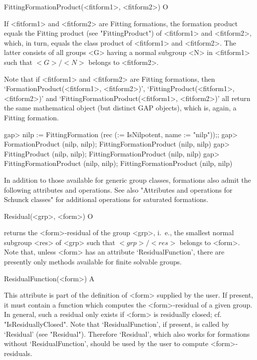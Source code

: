 \>FittingFormationProduct(<fitform1>, <fitform2>) O

If <fitform1> and <fitform2>  are Fitting formations, the formation product
equals the Fitting product (see "FittingProduct") of <fitform1> and
<fitform2>, which, in turn, equals the class product of <fitform1> and
<fitform2>. The latter consists of all groups <G> having a  normal subgroup
<N> in <fitform1> such that $<G>/<N>$ belongs to <fitform2>.

Note that if <fitform1> and <fitform2> are Fitting formations, then 
`FormationProduct(<fitform1>, <fitform2>)', `FittingProduct(<fitform1>,
<fitform2>)' and `FittingFormationProduct(<fitform1>, <fitform2>)' all
return the same mathematical object (but distinct GAP objects), which is,
again, a Fitting formation.


\beginexample
gap> nilp := FittingFormation (rec (\in := IsNilpotent, name := "nilp"));;
gap> FormationProduct (nilp, nilp);
FittingFormationProduct (nilp, nilp)
gap> FittingProduct (nilp, nilp);
FittingFormationProduct (nilp, nilp)
gap> FittingFormationProduct (nilp, nilp);
FittingFormationProduct (nilp, nilp)
\endexample


\null


In addition to those available for generic group classes, formations also
admit the following attributes and operations. See also "Attributes and
operations for Schunck classes" for additional operations for saturated
formations. 

\>Residual(<grp>, <form>) O

returns the <form>-residual of the group <grp>, i.~e., the smallest
normal subgroup <res> of <grp> such that $<grp>/<res>$ belongs to <form>.
Note that, unless <form>
has an attribute `ResidualFunction', there are presently only methods
available for finite solvable groups.

\>ResidualFunction(<form>) A

This attribute is part of the definition of <form> supplied by the user. If
present, it must contain a function which computes the <form>-residual of a given group.
In general, such a residual only exists if <form> is residually closed; cf.
"IsResiduallyClosed". Note that `ResidualFunction', if present, is called by `Residual'
(see "Residual"). Therefore `Residual', which also works for formations without
`ResidualFunction', should be used by the user to compute <form>-residuals.

